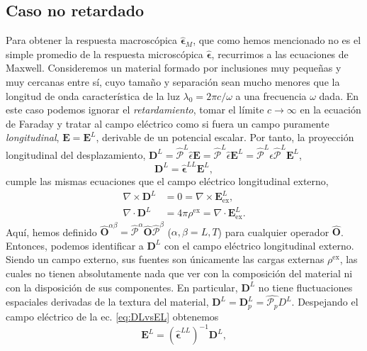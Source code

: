 \documentclass[12pt]{article}
\begin{document}
\subsection{Caso no retardado}\label{sec:noret}
Para obtener la respuesta macroscópica $\hat{\bm \epsilon}_M$, que
como hemos mencionado no es el simple promedio de la respuesta microscópica
$\hat{\bm\epsilon}$, recurrimos a las ecuaciones de Maxwell.
Consideremos un material formado por inclusiones muy pequeñas
y muy cercanas entre sí, cuyo tamaño y separación sean mucho menores que la
longitud de onda característica de la luz $\lambda_0=2\pi c/\omega$ a
una frecuencia $\omega$ dada. En este caso podemos ignorar el {\em
  retardamiento}, tomar el límite $c\to\infty$ en la ecuación de
Faraday y tratar al campo eléctrico como si fuera un campo puramente
{\em longitudinal}, $\bm E=\bm E^L$, derivable de un potencial escalar.
Por tanto, la proyección longitudinal del desplazamiento, $\bm
D^L=\hat{\mathcal P}^L\hat\epsilon \bm E=\hat{\mathcal P}^L\hat\epsilon
\bm E^L=\hat{\mathcal P}^L\hat\epsilon\hat{\mathcal P}^L \bm
E^L$,
\begin{equation}
  \label{eq:DLvsEL}
  \bm D^L=\hat{\bm\epsilon}^{LL}\bm E^L,
\end{equation}
cumple las mismas ecuaciones que el campo eléctrico
longitudinal externo,
\begin{equation}
  \label{eq:DvsEext}
  \begin{split}
    \nabla\times\bm D^L&=0=\nabla\times\bm E_{\text{ex}}^{L},\\
    \nabla\cdot\bm D^L&=4\pi\rho^{\text{ex}}=\nabla\cdot\bm E^{L}_{\text{ex}}.
  \end{split}
\end{equation}
Aquí, hemos definido
$\hat{\bm O}^{\alpha\beta}=\hat{\mathcal P}^\alpha\hat {\bm O}
\hat{\mathcal P}^\beta$ ($\alpha,\beta=L,T$) para cualquier operador
$\hat{\bm O}$. Entonces, podemos identificar a $\bm D^L$ con el
campo eléctrico longitudinal externo. Siendo un campo externo, sus
fuentes son únicamente las cargas externas $\rho^{\text{ex}}$, las
cuales no tienen absolutamente nada que ver con la composición del
material ni con la disposición de sus componentes. En particular,
$\bm D^L$ no tiene fluctuaciones espaciales derivadas de la textura
del material, $\bm D^L=\bm D^L_p= \hat{\mathcal P_p} D^L$. Despejando
el campo eléctrico de la ec. \eqref{eq:DLvsEL} obtenemos
\begin{equation}
  \label{eq:ELvsDL}
  \bm E^L=(\hat{\bm\epsilon}^{LL})^{-1}\bm D^L,
\end{equation}
\end{document}

